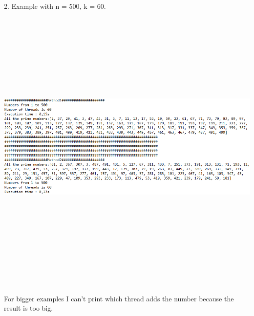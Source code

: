 \documentclass[14pt]{article}
\begin{document}
\newpage

\begin{center}
2. Example with n = 500, k = 60.
\vspace{10mm}

\includegraphics[height=5.5in, width = 6in]{50060result.png}\\
\end{center}\\
For bigger examples I can't print which thread adds the number because the result is too big.


\newpage
\end{document}
